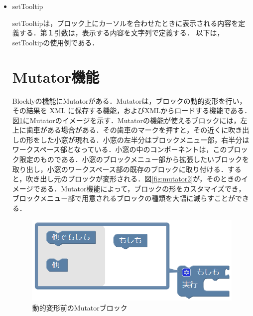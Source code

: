 \documentclass{risepaper}
\begin{document}
\begin{itemize}

\item setTooltip

setTooltipは，ブロック上にカーソルを合わせたときに表示される内容を定義する．第１引数は，表示する内容を文字列で定義する．
以下は，setTooltipの使用例である．


   \section{Mutator機能}
   
Blocklyの機能にMutatorがある．Mutatorは，ブロックの動的変形を行い，その結果を XML に保存する機能，およびXMLからロードする機能である．図\ref{fig:mutator1}にMutatorのイメージを示す．Mutatorの機能が使えるブロックには，左上に歯車がある場合がある．その歯車のマークを押すと，その近くに吹き出しの形をした小窓が現れる．小窓の左半分はブロックメニュー部，右半分はワークスペース部となっている．小窓の中のコンポーネントは，このブロック限定のものである．小窓のブロックメニュー部から拡張したいブロックを取り出し，小窓のワークスペース部の既存のブロックに取り付ける．すると，吹き出し元のブロックが変形される．図\ref{fig:mutator2}が，そのときのイメージである．Mutator機能によって，ブロックの形をカスタマイズでき，ブロックメニュー部で用意されるブロックの種類を大幅に減らすことができる．

\begin{figure}[h]
\begin{center}
\includegraphics[scale=0.5]{img/mutator1.eps}
\caption{動的変形前のMutatorブロック}%
\label{fig:mutator1}
\end{center}%
\end{figure}%


\end{itemize}
\end{document}
